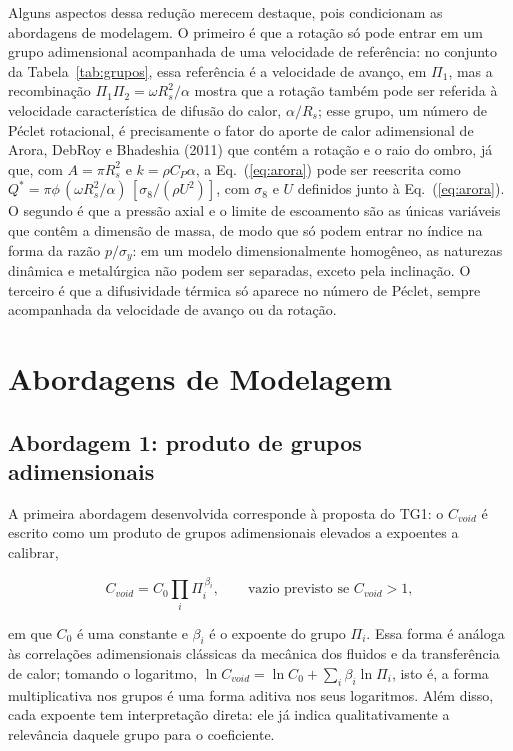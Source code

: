 \documentclass[12pt,openany]{report}
\begin{document}
Alguns aspectos dessa redução merecem destaque, pois condicionam as abordagens de modelagem. O primeiro é que a rotação só pode entrar em um grupo adimensional acompanhada de uma velocidade de referência: no conjunto da Tabela~\ref{tab:grupos}, essa referência é a velocidade de avanço, em $\Pi_1$, mas a recombinação $\Pi_1\Pi_2 = \omega R_{s}^{2}/\alpha$ mostra que a rotação também pode ser referida à velocidade característica de difusão do calor, $\alpha/R_s$; esse grupo, um número de Péclet rotacional, é precisamente o fator do aporte de calor adimensional de Arora, DebRoy e Bhadeshia (2011) que contém a rotação e o raio do ombro, já que, com $A = \pi R_{s}^{2}$ e $k = \rho C_P \alpha$, a Eq.~(\ref{eq:arora}) pode ser reescrita como $Q^{*} = \pi\phi\,(\omega R_{s}^{2}/\alpha)\,[\sigma_{8}/(\rho U^{2})]$, com $\sigma_8$ e $U$ definidos junto à Eq.~(\ref{eq:arora}). O segundo é que a pressão axial e o limite de escoamento são as únicas variáveis que contêm a dimensão de massa, de modo que só podem entrar no índice na forma da razão $p/\sigma_y$: em um modelo dimensionalmente homogêneo, as naturezas dinâmica e metalúrgica não podem ser separadas, exceto pela inclinação. O terceiro é que a difusividade térmica só aparece no número de Péclet, sempre acompanhada da velocidade de avanço ou da rotação.

\section{Abordagens de Modelagem}
\label{sec:abordagens}

\subsection{Abordagem 1: produto de grupos adimensionais}
\label{sec:abordagem_b}

A primeira abordagem desenvolvida corresponde à proposta do TG1: o $C_{void}$ é escrito como um produto de grupos adimensionais elevados a expoentes a calibrar,

\begin{equation}
C_{void} = C_0 \prod_{i} \Pi_{i}^{\,\beta_i}, \qquad \text{vazio previsto se } C_{void} > 1,
\label{eq:cvoid_b}
\end{equation}

\noindent em que $C_0$ é uma constante e $\beta_i$ é o expoente do grupo $\Pi_i$. Essa forma é análoga às correlações adimensionais clássicas da mecânica dos fluidos e da transferência de calor; tomando o logaritmo, $\ln C_{void} = \ln C_0 + \sum_i \beta_i \ln \Pi_i$, isto é, a forma multiplicativa nos grupos é uma forma aditiva nos seus logaritmos. Além disso, cada expoente tem interpretação direta: ele já indica qualitativamente a relevância daquele grupo para o coeficiente.
\end{document}
